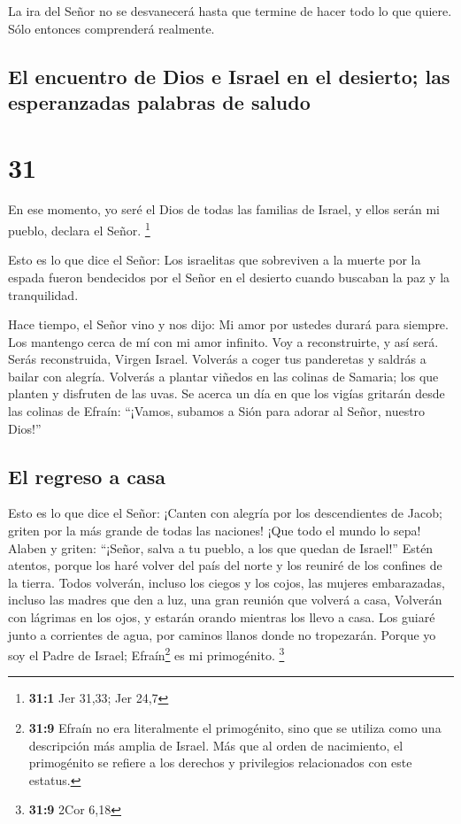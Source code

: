  La ira del Señor no se desvanecerá hasta que termine de
hacer todo lo que quiere. Sólo entonces comprenderá realmente.

\hypertarget{el-encuentro-de-dios-e-israel-en-el-desierto-las-esperanzadas-palabras-de-saludo}{%
\subsection{El encuentro de Dios e Israel en el desierto; las
esperanzadas palabras de
saludo}\label{el-encuentro-de-dios-e-israel-en-el-desierto-las-esperanzadas-palabras-de-saludo}}

\hypertarget{section-30}{%
\section{31}\label{section-30}}

 En ese momento, yo seré el Dios de todas las familias de
Israel, y ellos serán mi pueblo, declara el Señor. \footnote{\textbf{31:1}
  Jer 31,33; Jer 24,7}

 Esto es lo que dice el Señor: Los israelitas que
sobreviven a la muerte por la espada fueron bendecidos por el Señor en
el desierto cuando buscaban la paz y la tranquilidad.

 Hace tiempo, el Señor vino y nos dijo: Mi amor por
ustedes durará para siempre. Los mantengo cerca de mí con mi amor
infinito.  Voy a reconstruirte, y así será. Serás
reconstruida, Virgen Israel. Volverás a coger tus panderetas y saldrás a
bailar con alegría.  Volverás a plantar viñedos en las
colinas de Samaria; los que planten y disfruten de las uvas.
 Se acerca un día en que los vigías gritarán desde las
colinas de Efraín: ``¡Vamos, subamos a Sión para adorar al Señor,
nuestro Dios!''

\hypertarget{el-regreso-a-casa}{%
\subsection{El regreso a casa}\label{el-regreso-a-casa}}

 Esto es lo que dice el Señor: ¡Canten con alegría por los
descendientes de Jacob; griten por la más grande de todas las naciones!
¡Que todo el mundo lo sepa! Alaben y griten: ``¡Señor, salva a tu
pueblo, a los que quedan de Israel!''  Estén atentos,
porque los haré volver del país del norte y los reuniré de los confines
de la tierra. Todos volverán, incluso los ciegos y los cojos, las
mujeres embarazadas, incluso las madres que den a luz, una gran reunión
que volverá a casa,  Volverán con lágrimas en los ojos, y
estarán orando mientras los llevo a casa. Los guiaré junto a corrientes
de agua, por caminos llanos donde no tropezarán. Porque yo soy el Padre
de Israel; Efraín\footnote{\textbf{31:9} Efraín no era literalmente el
  primogénito, sino que se utiliza como una descripción más amplia de
  Israel. Más que al orden de nacimiento, el primogénito se refiere a
  los derechos y privilegios relacionados con este estatus.} es mi
primogénito. \footnote{\textbf{31:9} 2Cor 6,18}

